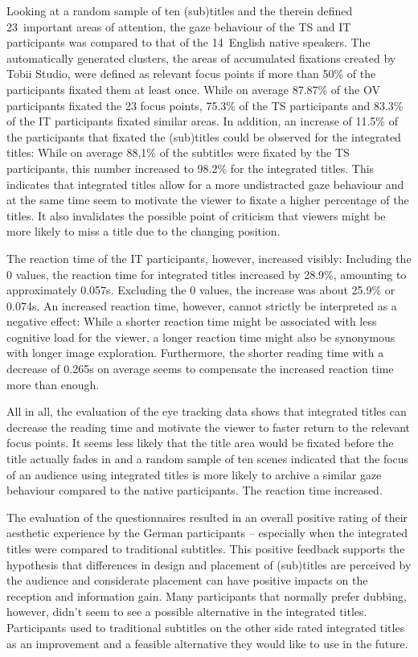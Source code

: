 \documentclass[output=paper]{langsci/langscibook}
\begin{document}
Looking at a random sample of ten (sub)titles and the therein defined 23~important areas of attention, the gaze behaviour of the TS and IT participants was compared to that of the 14~English native speakers. The automatically generated clusters, the areas of accumulated fixations created by Tobii Studio, were defined as relevant focus points if more than 50\% of the participants fixated them at least once. While on average 87.87\% of the OV participants fixated the 23 focus points, 75.3\% of the TS participants and 83.3\% of the IT participants fixated similar areas. In addition, an increase of 11.5\% of the participants that fixated the (sub)titles could be observed for the integrated titles: While on average 88,1\% of the subtitles were fixated by the TS participants, this number increased to 98.2\% for the integrated titles. This indicates that integrated titles allow for a more undistracted gaze behaviour and at the same time seem to motivate the viewer to fixate a higher percentage of the titles. It also invalidates the possible point of criticism that viewers might be more likely to miss a title due to the changing position.



The reaction time of the IT participants, however, increased visibly: Including the 0 values, the reaction time for integrated titles increased by 28.9\%, amounting to approximately 0.057s. Excluding the 0 values, the increase was about 25.9\% or 0.074s. An increased reaction time, however, cannot strictly be interpreted as a negative effect: While a shorter reaction time might be associated with less cognitive load for the viewer, a longer reaction time might also be synonymous with longer image exploration. Furthermore, the shorter reading time with a decrease of 0.265s on average seems to compensate the increased reaction time more than enough.



All in all, the evaluation of the eye tracking data shows that integrated titles can decrease the reading time and motivate the viewer to faster return to the relevant focus points. It seems less likely that the title area would be fixated before the title actually fades in and a random sample of ten scenes indicated that the focus of an audience using integrated titles is more likely to archive a similar gaze behaviour compared to the native participants. The reaction time increased.



The evaluation of the questionnaires resulted in an overall positive rating of their aesthetic experience by the German participants – especially when the integrated titles were compared to traditional subtitles. This positive feedback supports the hypothesis that differences in design and placement of (sub)titles are perceived by the audience and considerate placement can have positive impacts on the reception and information gain. Many participants that normally prefer dubbing, however, didn’t seem to see a possible alternative in the integrated titles. Participants used to traditional subtitles on the other side rated integrated titles as an improvement and a feasible alternative they would like to use in the future.
\end{document}

